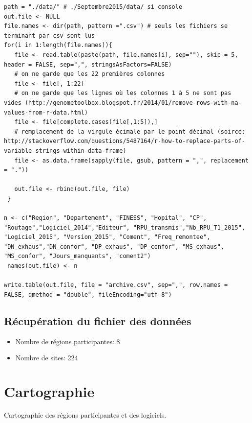 \documentclass[]{article}
\providecommand{\tightlist}{%
  \setlength{\itemsep}{0pt}\setlength{\parskip}{0pt}}
\begin{document}
\begin{verbatim}
path = "./data/" # ./Septembre2015/data/ si console
out.file <- NULL
file.names <- dir(path, pattern =".csv") # seuls les fichiers se terminant par csv sont lus
for(i in 1:length(file.names)){
   file <- read.table(paste(path, file.names[i], sep=""), skip = 5, header = FALSE, sep=",", stringsAsFactors=FALSE)
   # on ne garde que les 22 premières colonnes
   file <- file[, 1:22]
   # on ne garde que les lignes où les colonnes 1 à 5 ne sont pas vides (http://genometoolbox.blogspot.fr/2014/01/remove-rows-with-na-values-from-r-data.html)
   file <- file[complete.cases(file[,1:5]),]
   # remplacement de la virgule écimale par le point décimal (soirce: http://stackoverflow.com/questions/5487164/r-how-to-replace-parts-of-variable-strings-within-data-frame)
   file <- as.data.frame(sapply(file, gsub, pattern = ",", replacement = "."))

   out.file <- rbind(out.file, file)
 }

n <- c("Region", "Departement", "FINESS", "Hopital", "CP", "Routage","Logiciel_2014","Editeur", "RPU_transmis","Nb_RPU_T1_2015", "Logiciel_2015", "Version_2015", "Coment", "Freq_remontee", "DN_exhaus","DN_confor", "DP_exhaus", "DP_confor", "MS_exhaus", "MS_confor", "Jours_manquants", "coment2")
 names(out.file) <- n

write.table(out.file, file = "archive.csv", sep=",", row.names = FALSE, qmethod = "double", fileEncoding="utf-8")
\end{verbatim}

\subsection{Récupération du fichier des
données}\label{recuperation-du-fichier-des-donnees}

\begin{itemize}
\tightlist
\item
  Nombre de régions participantes: 8
\item
  Nombre de sites: 224
\end{itemize}

\section{Cartographie}\label{cartographie}

Cartographie des régions participantes et des logiciels.
\end{document}
